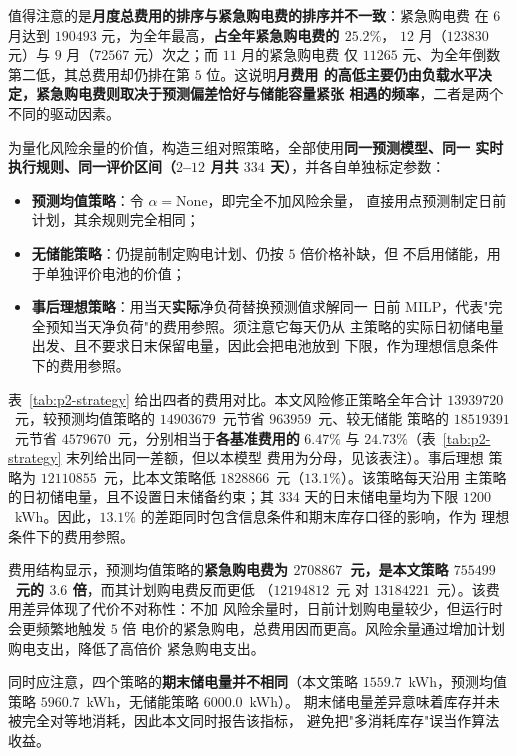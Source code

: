 值得注意的是\textbf{月度总费用的排序与紧急购电费的排序并不一致}：紧急购电费
在 $6$ 月达到 $190493$ 元，为全年最高，\textbf{占全年紧急购电费的 $25.2\%$}，
$12$ 月（$123830$ 元）与 $9$ 月（$72567$ 元）次之；而 $11$ 月的紧急购电费
仅 $11265$ 元、为全年倒数第二低，其总费用却仍排在第 $5$ 位。这说明\textbf{月费用
的高低主要仍由负载水平决定，紧急购电费则取决于预测偏差恰好与储能容量紧张
相遇的频率}，二者是两个不同的驱动因素。

为量化风险余量的价值，构造三组对照策略，全部使用\textbf{同一预测模型、同一
实时执行规则、同一评价区间（$2$--$12$ 月共 $334$ 天）}，并各自单独标定参数：

\begin{itemize}
  \item \textbf{预测均值策略}：令 $\alpha=\text{None}$，即完全不加风险余量，
        直接用点预测制定日前计划，其余规则完全相同；
  \item \textbf{无储能策略}：仍提前制定购电计划、仍按 $5$ 倍价格补缺，但
        不启用储能，用于单独评价电池的价值；
  \item \textbf{事后理想策略}：用当天\textbf{实际}净负荷替换预测值求解同一
        日前 MILP，代表"完全预知当天净负荷"的费用参照。须注意它每天仍从
        主策略的实际日初储电量出发、且不要求日末保留电量，因此会把电池放到
        下限，作为理想信息条件下的费用参照。
\end{itemize}

表~\ref{tab:p2-strategy} 给出四者的费用对比。本文风险修正策略全年合计
$13939720$~元，较预测均值策略的 $14903679$~元节省 $963959$~元、较无储能
策略的 $18519391$~元节省 $4579670$~元，分别相当于\textbf{各基准费用的}
$6.47\%$ 与 $24.73\%$（表~\ref{tab:p2-strategy} 末列给出同一差额，但以本模型
费用为分母，见该表注）。事后理想
策略为 $12110855$~元，比本文策略低 $1828866$~元（$13.1\%$）。该策略每天沿用
主策略的日初储电量，且不设置日末储备约束；其 $334$ 天的日末储电量均为下限
$1200$~kWh。因此，$13.1\%$ 的差距同时包含信息条件和期末库存口径的影响，作为
理想条件下的费用参照。

费用结构显示，预测均值策略的\textbf{紧急购电费为
$2708867$~元，是本文策略 $755499$~元的 $3.6$ 倍}，而其计划购电费反而更低
（$12194812$~元 对 $13184221$~元）。该费用差异体现了代价不对称性：不加
风险余量时，日前计划购电量较少，但运行时会更频繁地触发 $5$ 倍
电价的紧急购电，总费用因而更高。风险余量通过增加计划购电支出，降低了高倍价
紧急购电支出。

同时应注意，四个策略的\textbf{期末储电量并不相同}（本文策略
$1559.7$~kWh，预测均值策略 $5960.7$~kWh，无储能策略 $6000.0$~kWh）。
期末储电量差异意味着库存并未被完全对等地消耗，因此本文同时报告该指标，
避免把"多消耗库存"误当作算法收益。

